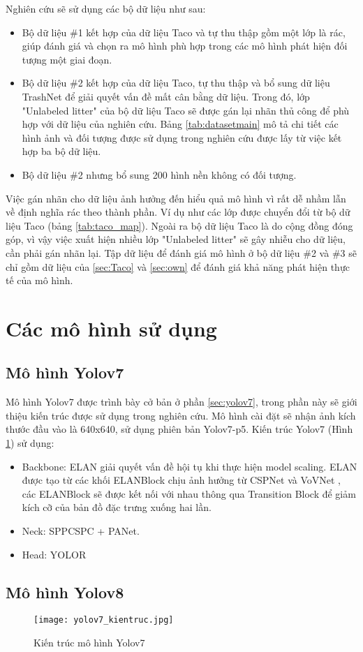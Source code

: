 \documentclass[../the.tex]{subfiles}
\begin{document}
{\fontsize{13}{12} \selectfont
Nghiên cứu sẽ sử dụng các bộ dữ liệu như sau:
\begin{itemize}
	\item Bộ dữ liệu \#1 kết hợp của dữ liệu Taco và tự thu thập gồm một lớp là rác, giúp đánh giá và chọn ra mô hình phù hợp trong các mô hình phát hiện đối tượng một giai đoạn.
	\item Bộ dữ liệu \#2 kết hợp của dữ liệu Taco, tự thu thập và bổ sung dữ liệu TrashNet để giải quyết vấn đề mất cân bằng dữ liệu. 
	Trong đó, lớp "Unlabeled litter" của bộ dữ liệu Taco sẽ được gán lại nhãn thủ công để phù hợp với dữ liệu của nghiên cứu. Bảng \ref{tab:datasetmain} mô tả chi tiết các hình ảnh và đối tượng được sử dụng trong nghiên cứu được lấy từ việc kết hợp ba bộ dữ liệu.\label{item:dataset}
	\item Bộ dữ liệu \#2 nhưng bổ sung 200 hình nền không có đối tượng.
\end{itemize}
\bigskip

Việc gán nhãn cho dữ liệu ảnh hưởng đến hiểu quả mô hình vì rất dễ nhầm lẫn về định nghĩa rác theo thành phần. Ví dụ như các lớp được chuyển đổi từ bộ dữ liệu Taco (bảng \ref{tab:taco_map}).
Ngoài ra bộ dữ liệu Taco là do cộng đồng đóng góp, vì vậy việc xuất hiện nhiều lớp "Unlabeled litter" sẽ gây nhiễu cho dữ liệu, cần phải gán nhãn lại.
Tập dữ liệu để đánh giá mô hình ở bộ dữ liệu \#2 và \#3 sẽ chỉ gồm dữ liệu của \ref{sec:Taco} và \ref{sec:own} để đánh giá khả năng phát hiện thực tế của mô hình.
}


\section{Các mô hình sử dụng}
\label{sec:model} 
\subsection{Mô hình Yolov7}
{\fontsize{13}{12} \selectfont  
Mô hình Yolov7 được trình bày cở bản ở phần \ref{sec:yolov7}, trong phần này sẽ giới thiệu kiến trúc được sử dụng trong nghiên cứu. Mô hình cài đặt sẽ nhận ảnh kích thước đầu vào là 640x640, sử dụng phiên bản Yolov7-p5. Kiến trúc Yolov7 (Hình \ref{fig:yolov7_kientruc}) sử dụng:
\begin{itemize}
	\item Backbone: ELAN giải quyết vấn đề hội tụ khi thực hiện model scaling. ELAN được tạo từ các khối ELANBlock chịu ảnh hưởng từ CSPNet \cite{wang2019cspnet} và VoVNet \cite{lee2019energy}, các ELANBlock sẽ được kết nối với nhau thông qua Transition Block để giảm kích cỡ của bản đồ đặc trưng xuống hai lần.
	\item Neck: SPPCSPC + PANet.
	\item Head: YOLOR
\end{itemize}
\bigskip
}
\subsection{Mô hình Yolov8}
{\fontsize{13}{12} \selectfont 

}

\begin{figure}[H]
	\centering
	\texttt{[image: yolov7\_kientruc.jpg]}
	\caption{Kiến trúc mô hình Yolov7}
	\label{fig:yolov7_kientruc}
\end{figure}
\end{document}

